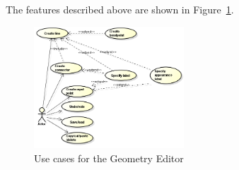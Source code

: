 The features described above are shown in Figure~\ref{fig:use-cases-geometry-editor}.

\begin{figure}[hp]
\begin{center}
  \includegraphics[width=0.5\textwidth]{image/uc-geometry.png}
  \caption{Use cases for the Geometry Editor }
  \label{fig:use-cases-geometry-editor}
\end{center}
\end{figure}